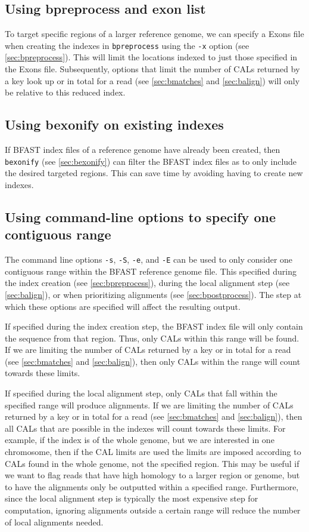 \documentclass[a4paper,12pt]{book}
\newcommand{\TT}[1]{{\tt #1}} %
\newcommand{\BRGF}{BFAST reference genome file} %
\newcommand{\BIF}{BFAST index file} %
\begin{document}
\subsection{Using bpreprocess and exon list}
\label{sec:using-exon-list}
To target specific regions of a larger reference genome, we can specify a Exons file when creating the indexes in \TT{bpreprocess} using the \TT{-x} option (see \autoref{sec:bpreprocess}). 
This will limit the locations indexed to just those specified in the Exons file.
Subsequently, options that limit the number of CALs returned by a key look up or in total for a read (see \autoref{sec:bmatches} and \autoref{sec:balign}) will only be relative to this reduced index.

\subsection{Using bexonify on existing indexes}
\label{sec:using-bexonify}
If \BIF{s} of a reference genome have already been created, then \TT{bexonify} (see \autoref{sec:bexonify}) can filter the \BIF{s} as to only include the desired targeted regions. 
This can save time by avoiding having to create new indexes.
\subsection{Using command-line options to specify one contiguous range}
The command line options \TT{-s}, \TT{-S}, \TT{-e}, and \TT{-E} can be used to only consider one contiguous range within the \BRGF{}.
This specified during the index creation (see \autoref{sec:bpreprocess}), during the local alignment step (see \autoref{sec:balign}), or when prioritizing alignments (see \autoref{sec:bpostprocess}). 
The step at which these options are specified will affect the resulting output.

If specified during the index creation step, the \BIF{} will only contain the sequence from that region.
Thus, only CALs within this range will be found.
If we are limiting the number of CALs returned by a key or in total for a read (see \autoref{sec:bmatches} and \autoref{sec:balign}), then only CALs within the range will count towards these limits.

If specified during the local alignment step, only CALs that fall within the specified range will produce alignments.
If we are limiting the number of CALs returned by a key or in total for a read (see \autoref{sec:bmatches} and \autoref{sec:balign}), then all CALs that are possible in the indexes will count towards these limits.
For example, if the index is of the whole genome, but we are interested in one chromosome, then if the CAL limits are used the limits are imposed according to CALs found in the whole genome, not the specified region.
This may be useful if we want to flag reads that have high homology to a larger region or genome, but to have the alignments only be outputted within a specified range.
Furthermore, since the local alignment step is typically the most expensive step for computation, ignoring alignments outside a certain range will reduce the number of local alignments needed.
\end{document}
